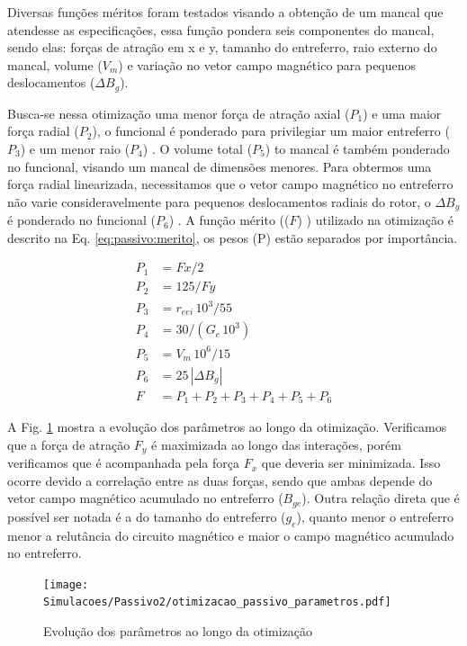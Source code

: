 Diversas funções méritos foram testados visando a obtenção de um mancal que atendesse as especificações, essa função pondera seis componentes do mancal, sendo elas: forças de atração em x e y, tamanho do entreferro, raio externo do mancal,  volume ($V_m$) e variação no vetor campo magnético para pequenos deslocamentos ($\Delta B_{g}$).

Busca-se nessa otimização uma menor força de atração axial ($P_1$) e uma maior força radial ($P_2$), o funcional é ponderado para privilegiar um maior entreferro ($P_3$) e um menor raio ($P_4$) . O volume total ($P_5$) to mancal é também ponderado no funcional, visando um mancal de dimensões menores. Para obtermos uma força radial linearizada, necessitamos que o vetor campo magnético no entreferro não varie consideravelmente para pequenos deslocamentos radiais do rotor, o $\Delta B_{g}$ é ponderado no funcional ($P_6$) . A função mérito (($F$) ) utilizado na otimização é descrito na Eq. \ref{eq:passivo:merito},  os pesos (P) estão separados por importância.

\begin{align}
P_1 &= Fx/2 				\\ 
P_2 &= 125/Fy		\\        
P_3 &= r_{eei}\, 10^3/55 \\     
P_4&= 30/(G_e \,  10^3) \\    
P_5 &= V_m\, 10^6/15 \\        
P_6 &= 25 \,  |{\Delta B_{g}}|\\   
F &= P_1 + P_2 + P_3 + P_4 + P_5 + P_6   \label{eq:passivo:merito}
\end{align}

A Fig. \ref{fig:otimizacao_passivo_parametros} mostra a evolução dos parâmetros ao longo da otimização. Verificamos que a força de atração $F_y$ é maximizada ao longo das interações, porém verificamos que é acompanhada pela força $F_x$ que deveria ser minimizada. Isso ocorre devido a correlação entre as duas forças, sendo que ambas depende do vetor campo magnético acumulado no entreferro ($B_{ge}$). Outra relação direta que é possível ser notada é a do tamanho do entreferro ($g_e$), quanto menor o entreferro menor a relutância do circuito magnético e maior o campo magnético acumulado no entreferro.


\begin{figure}[th!]
	\centering
	\texttt{[image: Simulacoes/Passivo2/otimizacao\_passivo\_parametros.pdf]}
	\caption{Evolução dos parâmetros ao longo da otimização}
	\label{fig:otimizacao_passivo_parametros}
\end{figure} 

